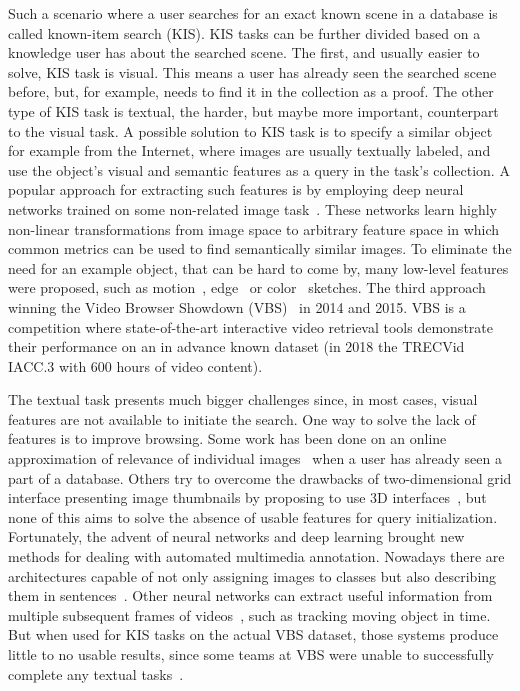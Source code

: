 Such a scenario where a user searches for an exact known scene in a database is called known-item search (KIS). KIS tasks can be further divided based on a knowledge user has about the searched scene. The first, and usually easier to solve, KIS task is visual. This means a user has already seen the searched scene before, but, for example, needs to find it in the collection as a proof. The other type of KIS task is textual, the harder, but maybe more important, counterpart to the visual task.
A possible solution to KIS task is to specify a similar object for example from the Internet, where images are usually textually labeled, and use the object's visual and semantic features as a query in the task's collection. A popular approach for extracting such features is by employing deep neural networks trained on some non-related image task~\cite{deepFeatures}. These networks learn highly non-linear transformations from image space to arbitrary feature space in which common metrics can be used to find semantically similar images.
To eliminate the need for an example object, that can be hard to come by, many low-level features were proposed, such as motion~\cite{motionSketch}, edge~\cite{ITEC2} or color~\cite{sigBrowser} sketches. The third approach winning the Video Browser Showdown (VBS)~\cite{cobarzan2017interactive} in 2014 and 2015. VBS is a competition where state-of-the-art interactive video retrieval tools demonstrate their performance on an in advance known dataset (in 2018 the TRECVid IACC.3 with 600 hours of video content).

The textual task presents much bigger challenges since, in most cases, visual features are not available to initiate the search. One way to solve the lack of features is to improve browsing. Some work has been done on an online approximation of relevance of individual images~\cite{suditu2011heat} when a user has already seen a part of a database. Others try to overcome the drawbacks of two-dimensional grid interface presenting image thumbnails by proposing to use 3D interfaces~\cite{schoeffmann20143}, but none of this aims to solve the absence of usable features for query initialization. Fortunately, the advent of neural networks and deep learning brought new methods for dealing with automated multimedia annotation. Nowadays there are architectures capable of not only assigning images to classes but also describing them in sentences~\cite{vinyals2017show}. Other neural networks can extract useful information from multiple subsequent frames of videos~\cite{bertinetto2016fully}, such as tracking moving object in time. But when used for KIS tasks on the actual VBS dataset, those systems produce little to no usable results, since some teams at VBS were unable to successfully complete any textual tasks~\cite{Lokoc-influential-trends}.

